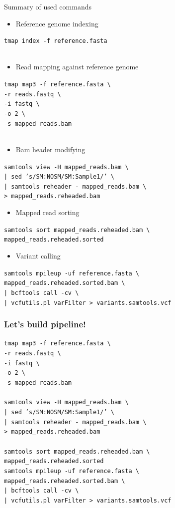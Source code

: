 \documentclass{beamer}
\newcommand{\refindex}[1]{\texttt{tmap index -f #1}}
\newcommand{\tmap}[3]{\texttt{tmap map3 -f #1 \textbackslash \\
    -r #2 \textbackslash \\
    -i fastq \textbackslash \\
    -o 2 \textbackslash \\
    -s #3
  }
}
\newcommand{\sortbam}[2]{\texttt{samtools sort #1 \textbackslash \\ #2}}
\newcommand{\reheader}[2]{\texttt{samtools view -H #1 \textbackslash \\
    | sed 's/SM:NOSM/SM:Sample1/' \textbackslash \\
    | samtools reheader - mapped\_reads.bam \textbackslash \\
    > #2
  }
}
\newcommand{\samtoolssnp}[3]{\texttt{samtools mpileup -uf #1 \textbackslash \\
    #2 \textbackslash \\
    | bcftools call -cv \textbackslash \\
    | vcfutils.pl varFilter > #3
  }
}
\begin{document}

\begin{frame}{Summary of used commands}
  
  \begin{itemize}
    \item Reference genome indexing
  \end{itemize}
  \refindex{reference.fasta}\\~\\

  \begin{itemize}
    \item Read mapping against reference genome
  \end{itemize}
  \tmap{reference.fasta}{reads.fastq}{mapped\_reads.bam}\\~\\
  
  \begin{itemize}
    \item Bam header modifying
  \end{itemize}
  \reheader{mapped\_reads.bam}{mapped\_reads.reheaded.bam}
\end{frame}

\begin{frame}

  \begin{itemize}
    \item Mapped read sorting
  \end{itemize}
  \sortbam{mapped\_reads.reheaded.bam}{mapped\_reads.reheaded.sorted}

  \begin{itemize}
    \item Variant calling
  \end{itemize}
  \samtoolssnp{reference.fasta}{mapped\_reads.reheaded.sorted.bam}{variants.samtools.vcf}
\end{frame}

\begin{frame}
  \frametitle{Let's build pipeline!}
  \tmap{reference.fasta}{reads.fastq}{mapped\_reads.bam}\\~\\
  \reheader{mapped\_reads.bam}{mapped\_reads.reheaded.bam}\\~\\
  
  \sortbam{mapped\_reads.reheaded.bam}{mapped\_reads.reheaded.sorted}\\
  \samtoolssnp{reference.fasta}{mapped\_reads.reheaded.sorted.bam}{variants.samtools.vcf}
\end{frame}

\end{document}
